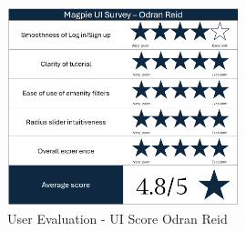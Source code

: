 \begin{figure}[h!]
    \centering
    \includegraphics[width=0.6\textwidth]{images/survey-odran.png}
    \caption{User Evaluation - UI Score Odran Reid}
    \label{fig:odranscore}
\end{figure}